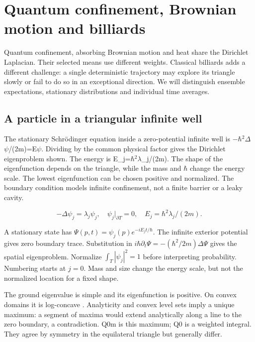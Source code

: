 \documentclass[11pt,oneside,openany]{book}
\begin{document}
\chapter{Quantum confinement, Brownian motion and billiards}\label{ch:4}

Quantum confinement, absorbing Brownian motion and heat share the Dirichlet Laplacian. Their selected means use different weights. Classical billiards adds a different challenge: a single deterministic trajectory may explore its triangle slowly or fail to do so in an exceptional direction. We will distinguish ensemble expectations, stationary distributions and individual time averages.


\section{A particle in a triangular infinite well}\label{sec:slide47}

The stationary Schr\"odinger equation inside a zero-potential infinite well is \ensuremath{-}\ensuremath{\hbar}\ensuremath{^2}\ensuremath{\Delta}\ensuremath{\psi}/(2m)=E\ensuremath{\psi}. Dividing by the common physical factor gives the Dirichlet eigenproblem shown. The energy is E\_j=\ensuremath{\hbar}\ensuremath{^2}\ensuremath{\lambda}\_j/(2m). The shape of the eigenfunction depends on the triangle, while the mass and \ensuremath{\hbar} change the energy scale. The lowest eigenfunction can be chosen positive and normalized. The boundary condition models infinite confinement, not a finite barrier or a leaky cavity.


\[-\Delta\psi_j=\lambda_j\psi_j,\quad\psi_j|_{\partial T}=0,\quad E_j=\hbar^2\lambda_j/(2m).\]



A stationary state has
$\Psi(p,t)=\psi_j(p)e^{-iE_jt/\hbar}$.
The infinite exterior potential gives zero boundary trace.
Substitution in
$i\hbar\partial_t\Psi=-(\hbar^2/2m)\Delta\Psi$
gives the spatial eigenproblem. Normalize
$\int_T|\psi_j|^2=1$ before interpreting probability.
Numbering starts at $j=0$. Mass and size change the energy scale,
but not the normalized location for a fixed shape.

The ground eigenvalue is simple and its eigenfunction is positive.
On convex domains it is log-concave \cite{brascamp}. Analyticity and convex level
sets imply a unique maximum: a segment of maxima would extend
analytically along a line to the zero boundary, a contradiction.
Q0m is this maximum; Q0 is a weighted integral. They agree by symmetry
in the equilateral triangle but generally differ.
\end{document}
